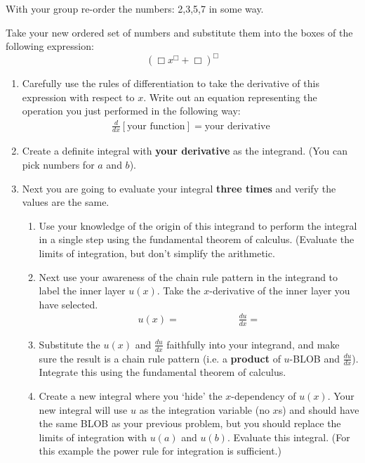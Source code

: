 \documentclass{ximera}
\begin{document}
\begin{exercise}
 With your group re-order the numbers: 2,3,5,7 in some way. 

Take your new ordered set of numbers and substitute them into the boxes of the following expression:
\[(\Box x^\Box +\Box)^\Box\]

    \begin{enumerate}
        
        \item Carefully use the rules of differentiation to take the derivative of this expression with respect to $x$. Write out an equation representing the operation you just performed in the following way:
            \begin{align}
	            \frac{d}{dx}\left[ \text{your function}\right] = \text{your derivative} \nonumber
            \end{align}

        \item Create a definite integral with {\bf{your derivative}} as the integrand. (You can pick numbers for $a$ and $b$). 

        \item Next you are going to evaluate your integral {\bf{three times}} and verify the values are the same.
            \begin{enumerate}
                \item Use your knowledge of the origin of this integrand to perform the integral in a single step using the fundamental theorem of calculus. (Evaluate the limits of integration, but don't simplify the arithmetic.

                \item Next use your awareness of the chain rule pattern in the integrand to label the inner layer $u(x)$. Take the $x$-derivative of the inner layer you have selected.
                    \begin{align}
	                    u(x) = \hspace{1in} \frac{du}{dx} = \nonumber
                    \end{align}

                \item Substitute the $u(x)$ and $\frac{du}{dx}$ faithfully into your integrand, and make sure the result is a chain rule pattern (i.e. a {\bf{product}} of $u$-BLOB and $\frac{du}{dx}$). Integrate this using the fundamental theorem of calculus. 

                \item Create a new integral where you `hide' the $x$-dependency of $u(x)$. Your new integral will use $u$ as the integration variable (no $x$s) and should have the same BLOB as your previous problem, but you should replace the limits of integration with $u(a)$ and $u(b)$. Evaluate this integral. (For this example the power rule for integration is sufficient.)


\end{enumerate}
\end{enumerate}
\end{exercise}
\end{document}
